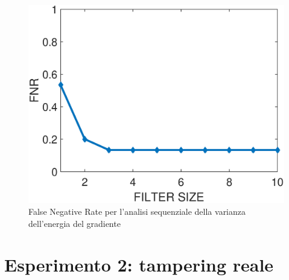 \begin{figure}[tb]
	\centering
	\includegraphics[width=13cm]{diagrammi/FNR}
	\caption{False Negative Rate per l'analisi sequenziale della varianza dell'energia del gradiente}
	\label{fig:FNR}
\end{figure}
\section{Esperimento 2: tampering reale}
\label{esp2}

